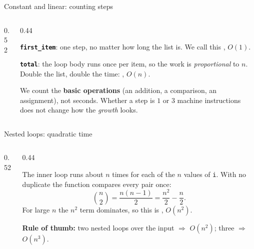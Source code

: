 \documentclass[aspectratio=169,10pt]{beamer}
\begin{document}
\begin{frame}{Constant and linear: counting steps}
\begin{columns}[T]
\begin{column}{0.52\textwidth}
\vspace{2mm}
\end{column}
\begin{column}{0.44\textwidth}
{\small
\textbf{\texttt{first\_item}}: one step, no matter how long the list is. We call this , $O(1)$.

\vspace{3mm}
\textbf{\texttt{total}}: the loop body runs once per item, so the work is \emph{proportional} to $n$. Double the list, double the time: , $O(n)$.

\vspace{3mm}
We count the \textbf{basic operations} (an addition, a comparison, an assignment), not seconds. Whether a step is $1$ or $3$ machine instructions does not change how the \emph{growth} looks.}
\end{column}
\end{columns}
\end{frame}

\begin{frame}{Nested loops: quadratic time}
\begin{columns}[T]
\begin{column}{0.52\textwidth}
\vspace{2mm}
\end{column}
\begin{column}{0.44\textwidth}
{\small
The inner loop runs about $n$ times for each of the $n$ values of \texttt{i}. With no duplicate the function compares every pair once:
\[
\binom{n}{2}=\frac{n(n-1)}{2}=\frac{n^2}{2}-\frac{n}{2}.
\]
For large $n$ the $n^2$ term dominates, so this is , $O(n^2)$.

\vspace{2mm}
\textbf{Rule of thumb:} two nested loops over the input $\Rightarrow$ $O(n^2)$; three $\Rightarrow$ $O(n^3)$.}
\end{column}
\end{columns}
\end{frame}
\end{document}
